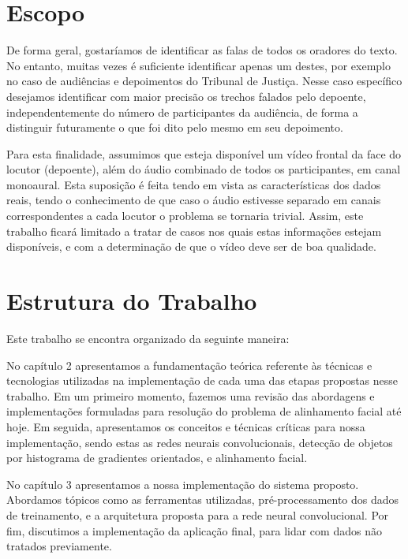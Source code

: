\section{Escopo}
\label{sec:scope}

De forma geral, gostaríamos de identificar as falas de todos os oradores do texto.
No entanto, muitas vezes é suficiente identificar apenas um destes, por exemplo no caso de audiências e depoimentos do Tribunal de Justiça.
Nesse caso específico desejamos identificar com maior precisão os trechos falados pelo depoente, independentemente do número de participantes da audiência, de forma a distinguir futuramente o que foi dito pelo mesmo em seu depoimento.

Para esta finalidade, assumimos que esteja disponível um vídeo frontal da face do locutor (depoente), além do áudio combinado de todos os participantes, em canal monoaural.
Esta suposição é feita tendo em vista as características dos dados reais, tendo o conhecimento de que caso o áudio estivesse separado em canais correspondentes a cada locutor o problema se tornaria trivial.
Assim, este trabalho ficará limitado a tratar de casos nos quais estas informações estejam disponíveis, e com a determinação de que o vídeo deve ser de boa qualidade.

\section{Estrutura do Trabalho}
\label{sec:structure}

Este trabalho se encontra organizado da seguinte maneira:

No capítulo 2 apresentamos a fundamentação teórica referente às técnicas e tecnologias utilizadas na implementação de cada uma das etapas propostas nesse trabalho.
Em um primeiro momento, fazemos uma revisão das abordagens e implementações formuladas para resolução do problema de alinhamento facial até hoje. 
Em seguida, apresentamos os conceitos e técnicas críticas para nossa implementação, sendo estas as redes neurais convolucionais, detecção de objetos por histograma de gradientes orientados, e alinhamento facial.

No capítulo 3 apresentamos a nossa implementação do sistema proposto. 
Abordamos tópicos como as ferramentas utilizadas, pré-processamento dos dados de treinamento, e a arquitetura proposta para a rede neural convolucional.
Por fim, discutimos a implementação da aplicação final, para lidar com dados não tratados previamente.

